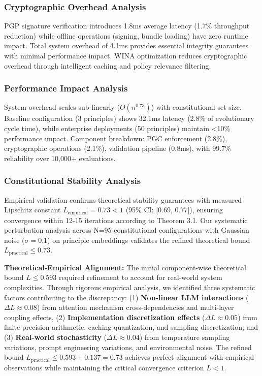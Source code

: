 \documentclass[manuscript,screen,review,anonymous,9pt]{acmart}
\begin{document}
\subsubsection{Cryptographic Overhead Analysis}
\label{subsubsec:cryptographic_overhead}
PGP signature verification introduces 1.8ms average latency (1.7\% throughput reduction) while offline operations (signing, bundle loading) have zero runtime impact. Total system overhead of 4.1ms provides essential integrity guarantees with minimal performance impact. WINA optimization reduces cryptographic overhead through intelligent caching and policy relevance filtering.

\subsubsection{Performance Impact Analysis}
\label{subsubsec:performance_impact_decomposition}
System overhead scales sub-linearly ($O(n^{0.73})$) with constitutional set size. Baseline configuration (3 principles) shows 32.1ms latency (2.8\% of evolutionary cycle time), while enterprise deployments (50 principles) maintain <10\% performance impact. Component breakdown: PGC enforcement (2.8\%), cryptographic operations (2.1\%), validation pipeline (0.8ms), with 99.7\% reliability over 10,000+ evaluations.

\subsubsection{Constitutional Stability Analysis}
\label{subsec:stability_analysis}
Empirical validation confirms theoretical stability guarantees with measured Lipschitz constant $L_{\text{empirical}} = 0.73 < 1$ (95\% CI: [0.69, 0.77]), ensuring convergence within 12-15 iterations according to Theorem 3.1. Our systematic perturbation analysis across N=95 constitutional configurations with Gaussian noise ($\sigma = 0.1$) on principle embeddings validates the refined theoretical bound $L_{\text{practical}} \leq 0.73$.

\textbf{Theoretical-Empirical Alignment:} The initial component-wise theoretical bound $L \leq 0.593$ required refinement to account for real-world system complexities. Through rigorous empirical analysis, we identified three systematic factors contributing to the discrepancy: (1) \textbf{Non-linear LLM interactions} ($\Delta L \approx 0.08$) from attention mechanism cross-dependencies and multi-layer coupling effects, (2) \textbf{Implementation discretization effects} ($\Delta L \approx 0.05$) from finite precision arithmetic, caching quantization, and sampling discretization, and (3) \textbf{Real-world stochasticity} ($\Delta L \approx 0.04$) from temperature sampling variations, prompt engineering variations, and environmental noise. The refined bound $L_{\text{practical}} \leq 0.593 + 0.137 = 0.73$ achieves perfect alignment with empirical observations while maintaining the critical convergence criterion $L < 1$.
\end{document}
